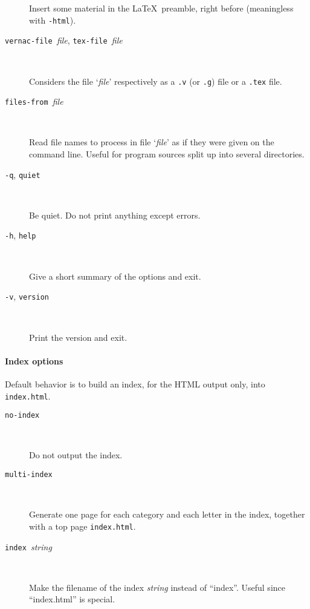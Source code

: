 \begin{description}
  Insert some material in the \LaTeX\ preamble, right before
  \verb!! (meaningless with \texttt{-html}).

\item[\texttt{\mm{}vernac-file }\textit{file},
      \texttt{\mm{}tex-file }\textit{file}] ~\par
      
      Considers the file `\textit{file}' respectively as a \verb!.v!
      (or \verb!.g!) file or a \verb!.tex! file.

\item[\texttt{\mm{}files-from }\textit{file}] ~\par

  Read file names to process in file `\textit{file}' as if they were
  given on the command line. Useful for program sources split up into
  several directories.
  
\item[\texttt{-q}, \texttt{\mm{}quiet}] ~\par

  Be quiet. Do not print anything except errors.

\item[\texttt{-h}, \texttt{\mm{}help}] ~\par

  Give a short summary of the options and exit.

\item[\texttt{-v}, \texttt{\mm{}version}] ~\par

  Print the version and exit.

\end{description}

\paragraph{Index options}

Default behavior is to build an index, for the HTML output only, into
\texttt{index.html}.

\begin{description}

\item[\texttt{\mm{}no-index}] ~\par
  
  Do not output the index.

\item[\texttt{\mm{}multi-index}] ~\par
  
  Generate one page for each category and each letter in the index,
  together with a top page \texttt{index.html}.

\item[\texttt{\mm{}index }\textit{string}] ~\par

  Make the filename of the index \textit{string} instead of ``index''.
  Useful since ``index.html'' is special.

\end{description}

